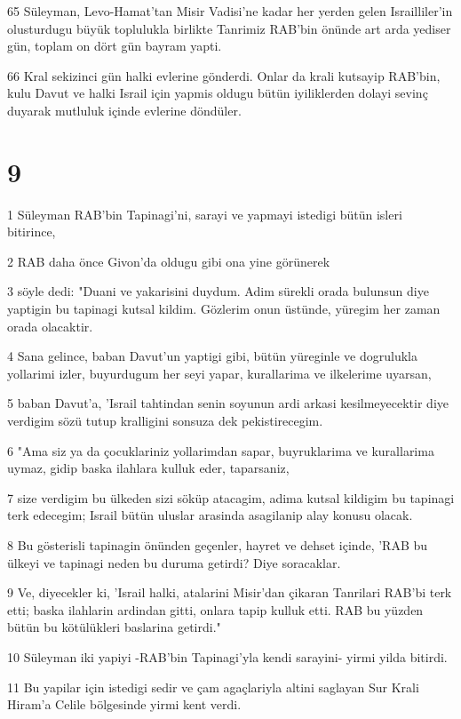 \par 65 Süleyman, Levo-Hamat'tan Misir Vadisi'ne kadar her yerden gelen Israilliler'in olusturdugu büyük toplulukla birlikte Tanrimiz RAB'bin önünde art arda yediser gün, toplam on dört gün bayram yapti.
\par 66 Kral sekizinci gün halki evlerine gönderdi. Onlar da krali kutsayip RAB'bin, kulu Davut ve halki Israil için yapmis oldugu bütün iyiliklerden dolayi sevinç duyarak mutluluk içinde evlerine döndüler.

\chapter{9}

\par 1 Süleyman RAB'bin Tapinagi'ni, sarayi ve yapmayi istedigi bütün isleri bitirince,
\par 2 RAB daha önce Givon'da oldugu gibi ona yine görünerek
\par 3 söyle dedi: "Duani ve yakarisini duydum. Adim sürekli orada bulunsun diye yaptigin bu tapinagi kutsal kildim. Gözlerim onun üstünde, yüregim her zaman orada olacaktir.
\par 4 Sana gelince, baban Davut'un yaptigi gibi, bütün yüreginle ve dogrulukla yollarimi izler, buyurdugum her seyi yapar, kurallarima ve ilkelerime uyarsan,
\par 5 baban Davut'a, 'Israil tahtindan senin soyunun ardi arkasi kesilmeyecektir diye verdigim sözü tutup kralligini sonsuza dek pekistirecegim.
\par 6 "Ama siz ya da çocuklariniz yollarimdan sapar, buyruklarima ve kurallarima uymaz, gidip baska ilahlara kulluk eder, taparsaniz,
\par 7 size verdigim bu ülkeden sizi söküp atacagim, adima kutsal kildigim bu tapinagi terk edecegim; Israil bütün uluslar arasinda asagilanip alay konusu olacak.
\par 8 Bu gösterisli tapinagin önünden geçenler, hayret ve dehset içinde, 'RAB bu ülkeyi ve tapinagi neden bu duruma getirdi? Diye soracaklar.
\par 9 Ve, diyecekler ki, 'Israil halki, atalarini Misir'dan çikaran Tanrilari RAB'bi terk etti; baska ilahlarin ardindan gitti, onlara tapip kulluk etti. RAB bu yüzden bütün bu kötülükleri baslarina getirdi."
\par 10 Süleyman iki yapiyi -RAB'bin Tapinagi'yla kendi sarayini- yirmi yilda bitirdi.
\par 11 Bu yapilar için istedigi sedir ve çam agaçlariyla altini saglayan Sur Krali Hiram'a Celile bölgesinde yirmi kent verdi.
